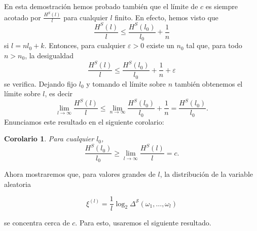 \documentclass{report}
\newtheorem{cor}{Corolario}[thm]
\begin{document}
En esta demostración hemos probado también que el límite de $c$ es siempre acotado por $\frac{H^S(l)}{l}$ para cualquier $l$ finito.
En efecto, hemos visto que
\[
    \frac{H^S(l)}{l} \leq \frac{H^S(l_0)}{l_0} + \frac{1}{n}
\]
si $l=n l_0+k$. Entonces, para cualquier $\varepsilon>0$ existe un $n_0$ tal que, para todo $n>n_0$, la desigualdad
\[
    \frac{H^S(l)}{l} \leq \frac{H^S(l_0)}{l_0} + \frac{1}{n} + \varepsilon
\]
se verifica. Dejando fijo $l_0$ y tomando el límite sobre $n$ también obtenemos el límite sobre $l$, es decir
\[
    \lim_{l\to\infty} \frac{H^S(l)}{l} \leq \lim_{n\to\infty} \frac{H^S(l_0)}{l_0} + \frac{1}{n} = \frac{H^S(l_0)}{l_0}.
\]
Enunciamos este resultado en el siguiente corolario:

\begin{cor}\label{corolario de la cota del límite de la entropia}
    Para cualquier $l_0$,
    \[
        \frac{H^S(l_0)}{l_0} \geq \lim_{l\to\infty} \frac{H^S(l)}{l} = c.
    \]
\end{cor}

Ahora mostraremos que, para valores grandes de \( l \), la distribución de la variable aleatoria

\[
\xi^{(l)} = \frac{1}{l} \log_2 \Delta^{\mathcal{S}}(\omega_1, \dots, \omega_l)
\]

se concentra cerca de \( c \). Para esto, usaremos el siguiente resultado.
\end{document}
